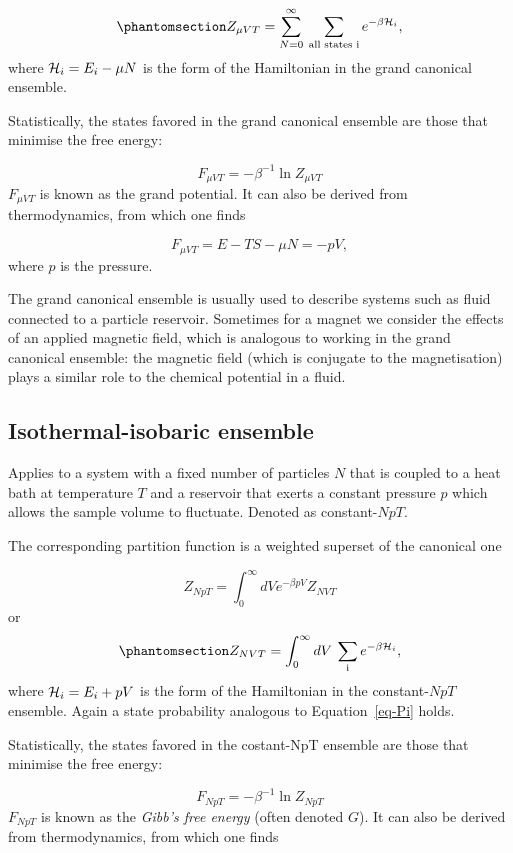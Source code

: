 \documentclass[
  letterpaper,
  DIV=11,
  numbers=noendperiod]{scrreprt}
\begin{document}
\begin{equation}\phantomsection\label{eq-ZmuVT}{
Z_{\mu VT}=\sum_{N=0}^\infty\:\sum_\textrm{all~states~i}e^{-\beta {\cal H}_i},
}\end{equation} where \({\cal H}_i=E_i-\mu N\) is the form of the
Hamiltonian in the grand canonical ensemble.

Statistically, the states favored in the grand canonical ensemble are
those that minimise the free energy:

\[
F_{\mu VT}=-\beta^{-1}\ln Z_{\mu VT}
\] \(F_{\mu VT}\) is known as the grand potential. It can also be
derived from thermodynamics, from which one finds

\[
F_{\mu VT}=E-TS-\mu N=-pV,
\] where \(p\) is the pressure.

The grand canonical ensemble is usually used to describe systems such as
fluid connected to a particle reservoir. Sometimes for a magnet we
consider the effects of an applied magnetic field, which is analogous to
working in the grand canonical ensemble: the magnetic field (which is
conjugate to the magnetisation) plays a similar role to the chemical
potential in a fluid.

\subsection*{Isothermal-isobaric
ensemble}\label{isothermal-isobaric-ensemble}

Applies to a system with a fixed number of particles \(N\) that is
coupled to a heat bath at temperature \(T\) and a reservoir that exerts
a constant pressure \(p\) which allows the sample volume to fluctuate.
Denoted as constant-\(NpT\).

The corresponding partition function is a weighted superset of the
canonical one

\[
Z_{NpT}=\int_0^\infty dV  e^{-\beta p V}Z_{NVT}
\] or \begin{equation}\phantomsection\label{eq-ZNpT}{
Z_{NVT}=\int_0^\infty dV\:\sum_\textrm{i}e^{-\beta {\cal H}_i},
}\end{equation} where \({\cal H}_i=E_i+pV\) is the form of the
Hamiltonian in the constant-\(NpT\) ensemble. Again a state probability
analogous to Equation~\ref{eq-Pi} holds.

Statistically, the states favored in the costant-NpT ensemble are those
that minimise the free energy:

\[
F_{NpT}=-\beta^{-1}\ln Z_{NpT}
\] \(F_{NpT}\) is known as the \emph{Gibb's free energy} (often denoted
\(G\)). It can also be derived from thermodynamics, from which one finds
\end{document}
